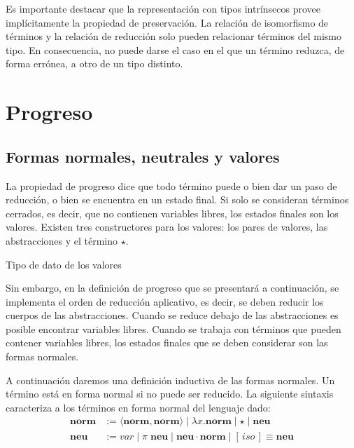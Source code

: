 Es importante destacar que la representación con tipos intrínsecos provee implícitamente la propiedad de preservación.
La relación de isomorfismo de términos \type{$\_\rightleftarrows\_$} y la relación de reducción \type{$\_\hookrightarrow\_$} solo pueden relacionar términos del mismo tipo. 
En consecuencia, no puede darse el caso en el que un término reduzca, de forma errónea, a otro de un tipo distinto.


\section{Progreso}

\subsection{Formas normales, neutrales y valores}

La propiedad de progreso dice que todo término puede o bien dar un paso de reducción, o bien se encuentra en un estado final.
Si solo se consideran términos cerrados, es decir, que no contienen variables libres, los estados finales son los valores.
Existen tres constructores para los valores: los pares de valores, las abstracciones y el término $\star$.

\begin{codigo}
	Tipo de dato de los valores
\end{codigo}

Sin embargo, en la definición de progreso que se presentará a continuación, se implementa el orden de reducción aplicativo, es decir, se deben reducir los cuerpos de las abstracciones.
Cuando se reduce debajo de las abstracciones es posible encontrar variables libres.
Cuando se trabaja con términos que pueden contener variables libres, los estados finales que se deben considerar son las formas normales.

A continuación daremos una definición inductiva de las formas normales. Un término está en forma normal si no puede ser reducido. La siguiente sintaxis caracteriza a los términos en forma normal del lenguaje dado: 
\begin{align*}
	\textbf{norm} &:= \langle \textbf{norm}, \textbf{norm} \rangle \mid \lambda x. \textbf{norm} \mid \star \mid \textbf{neu} \\
	\textbf{neu} &:= var \mid \pi\; \textbf{neu} \mid \textbf{neu} \cdot \textbf{norm} \mid [\, iso \,]\!\!\equiv \textbf{neu}
\end{align*}

